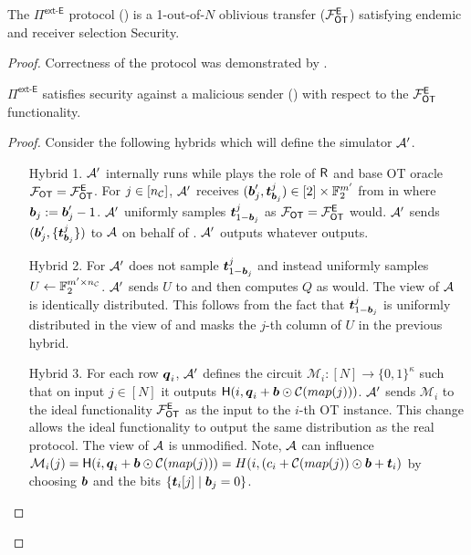\begin{lemma}\label{lem:ext-E}
	The $\Pi^{\textsf{ext-E}}$ protocol () is a 1-out-of-$N$ oblivious transfer ($\mathcal{F}_{\mathsf{OT}}^\mathsf{E}$) satisfying endemic and receiver selection Security.
\end{lemma}
\begin{proof}
	Correctness of the protocol was demonstrated by \cite{RSA:OrrOrsSch17}.%
	\begin{claim}\label{claim:ext-E-MalSender}

		$\Pi^\textsf{ext-E}$ satisfies security against a malicious sender () with respect to the $\mathcal{F}_{\mathsf{OT}}^\mathsf{E}$ functionality.

	\end{claim}
	\begin{proof}
		Consider the following hybrids which will define the simulator $\mathcal{A}'$. 
		\begin{enumerate}[leftmargin=0.6cm,itemindent=30pt]
			\item[Hybrid 1.] $\mathcal{A}'$ internally runs \Adv while plays the role of $\mathsf{R}$ and base OT oracle $\mathcal{F}_{\mathsf{OT}}=\mathcal{F}_{\mathsf{OT}}^\mathsf{E}$. For $j\in[{n_\mathcal{C}}]$, $\mathcal{A}'$ receives $(\boldsymbol{b}'_j,\boldsymbol{t}^j_{\boldsymbol{b}_j})\in [2]\times \mathbb{F}^{m'}_2$ from \Adv in  where $\boldsymbol{b}_j:=\boldsymbol{b}_j'-1$. $\mathcal{A}'$ uniformly samples $\boldsymbol{t}^j_{1-\boldsymbol{b}_j}$ as $\mathcal{F}_{\mathsf{OT}}=\mathcal{F}_{\mathsf{OT}}^\mathsf{E}$ would. $\mathcal{A}'$ sends $(\boldsymbol{b}_j', \{\boldsymbol{t}^j_{\boldsymbol{b}_j}\})$ to $\mathcal{A}$ on behalf of \OOT. $\mathcal{A}'$ outputs whatever \Adv outputs. 
			
			\item[Hybrid 2.] For  $\mathcal{A}'$ does not sample $\boldsymbol{t}^j_{1-\boldsymbol{b}_j}$ and instead uniformly samples $U\gets\mathbb{F}^{m'\times {n_\mathcal{C}}}_2$. $\mathcal{A}'$ sends $U$ to \Adv and then computes $Q$ as \send would. The view of $\mathcal{A}$ is identically distributed.
			\iffullversion
			 This follows from the fact that $\boldsymbol{t}^j_{1-\boldsymbol{b}_j}$ is uniformly distributed in the view of \Adv and masks the $j$-th column of $U$ in the previous hybrid. 
			\fi
			
			\item[Hybrid 3.]\label{hybrid:malSendExtract} For each row $\boldsymbol{q}_i$, $\mathcal{A}'$ defines the circuit $\mathcal{M}_i:[N]\rightarrow\{0,1\}^\kappa$ such that on input $j\in[N]$ it outputs $\mathsf{H}(i, \boldsymbol{q}_i+\boldsymbol{b}\odot \mathcal{C}(map(j)))$. $\mathcal{A}'$ sends $\mathcal{M}_i$ to the ideal functionality $\mathcal{F}_{\mathsf{OT}}^\mathsf{E}$ as the input to the $i$-th OT instance. 
			\iffullversion
			This change allows the ideal functionality to output the same distribution as the real protocol. The view of $\mathcal{A}$ is unmodified. Note, $\mathcal{A}$ can influence $\mathcal{M}_i(j)=\mathsf{H}(i, \boldsymbol{q}_i+\boldsymbol{b}\odot \mathcal{C}(map(j)))=H(i, (c_i + \mathcal{C}(map(j)) \odot \boldsymbol{b} + \boldsymbol{t}_i)$ by choosing $\boldsymbol{b}$ and the bits $\{\boldsymbol{t}_i[j] \mid \boldsymbol{b}_j=0\}$.
			\fi
			

\end{enumerate}
\end{proof}
\end{proof}

